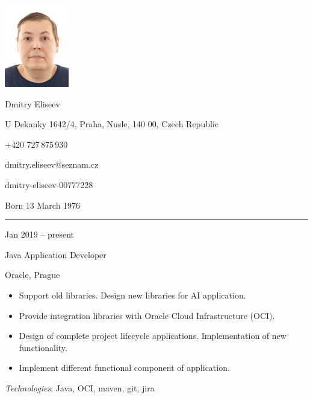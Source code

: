 \documentclass[a4paper,10pt]{article}
\newlength{\cvcolumngapwidth}
\newlength{\cvleftcolumnwidth}
\newlength{\cvrightcolumnwidth}
\newcommand{\cvnamestyle}[1]{{\Large\cvnamefont\textcolor{cvnamecolor}{#1}}}
\newcommand{\cvsectionstyle}[1]{{\normalsize\cvsectionfont\textcolor{cvsectioncolor}{#1}}}
\newcommand{\cvtitlestyle}[1]{{\large\cvtitlefont\textcolor{cvtitlecolor}{#1}}}
\newcommand{\cvdurationstyle}[1]{{\small\cvdurationfont\textcolor{cvdurationcolor}{#1}}}
\newlength{\cvafteritemskipamount}
\newlength{\cvaftersectionskipamount}
\newlength{\cvafternameskipamount}
\newlength{\cvafterpersonalinfolineskipamount}
\newlength{\cvaftertitleskipamount}
\newlength{\cvparskip}
\newcommand{\cvpersonalinfo}[2]{
    \begin{minipage}[t]{\cvleftcolumnwidth}
        \vspace{0mm} %
        \raggedleft #1
    \end{minipage}%
    \hspace{\cvcolumngapwidth}%
    \begin{minipage}[t]{\cvrightcolumnwidth}
        \vspace{0mm} %
        #2
    \end{minipage}

    \vspace{\cvafteritemskipamount}
}
\newcommand{\cvname}[1]{
    \cvnamestyle{#1}

    \vspace{\cvafternameskipamount}
}
\newcommand{\cvpersonalinfolinewithicon}[3]{
    \raisebox{.5\fontcharht\font`E-.5\height}{\texttt{[image: \#2]}}
    #3

    \vspace{\cvafterpersonalinfolineskipamount}
}
\newcommand{\cvsection}[1]{
    \begin{minipage}[t]{\cvleftcolumnwidth}
        \raggedleft\cvsectionstyle{#1}
    \end{minipage}%
    \hspace{\cvcolumngapwidth}%
    \begin{minipage}[t]{\cvrightcolumnwidth}
        \textcolor{cvrulecolor}{\rule{\cvrightcolumnwidth}{0.3mm}}
    \end{minipage}

    \vspace{\cvaftersectionskipamount}
}
\newcommand{\cvitem}[2]{
    \begin{minipage}[t]{\cvleftcolumnwidth}
        \raggedleft #1
    \end{minipage}%
    \hspace{\cvcolumngapwidth}%
    \begin{minipage}[t]{\cvrightcolumnwidth}
        \setlength{\parskip}{\cvparskip} #2
    \end{minipage}

    \vspace{\cvafteritemskipamount}
}
\newcommand{\cvtitle}[1]{
    \cvtitlestyle{#1}

    \vspace{\cvaftertitleskipamount}
    \vspace{-\cvparskip}
}
\begin{document}

\cvpersonalinfo{
    \includegraphics[height=36mm]{resources/photo.jpg}
}{
    \cvname{Dmitry Eliseev}

    \cvpersonalinfolinewithicon{height=4mm}{resources/IcoMoon-Free-PDF/072-location.pdf}{
        U Dekanky 1642/4, Praha, Nusle, 140 00, Czech Republic
    }

    \cvpersonalinfolinewithicon{height=4mm}{resources/IcoMoon-Free-PDF/067-phone.pdf}{
        +420 727\,875\,930
    }

    \cvpersonalinfolinewithicon{height=4mm}{resources/IcoMoon-Free-PDF/070-envelop.pdf}{
        dmitry.eliseev@seznam.cz
    }

    \cvpersonalinfolinewithicon{height=4mm}{resources/IcoMoon-Free-PDF/458-linkedin.pdf}{
        dmitry-eliseev-00777228
    }

    Born 13 March 1976
}



\cvsection{WORK EXPERIENCE}

\cvitem{
    \cvdurationstyle{Jan 2019 -- present}
}{
    \cvtitle{Java Application Developer}

    Oracle, Prague

    \begin{itemize}[leftmargin=*]
        \item Support old libraries. Design new libraries for AI application.
        \item Provide integration libraries with Oracle Cloud Infrastructure (OCI).
        \item Design of complete project lifecycle applications. Implementation of new functionality.
        \item Implement different functional component of application.
    \end{itemize}
    
    \textit{Technologies}: Java, OCI, maven, git, jira
}
\end{document}
